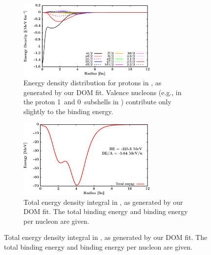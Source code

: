 \begin{figure}[tb]
    \centering
    \begin{subfigure}[c]{\textwidth}
        \centering
        \includegraphics[width=0.75\textwidth]{figures/ca40_EnergyDist.png}
        \caption[Energy density distribution for protons in \caForty]
        {
            Energy density distribution for protons in \caForty, as generated
            by our DOM fit. Valence nucleons (e.g., in the proton 1\sOne\ and
            0\dThree\ subshells in \caForty) contribute only slightly to the binding
            energy.
        }
        \label{Ca40EnergyDist}
    \end{subfigure}\vspace{16pt}
    \begin{subfigure}[c]{\textwidth}
        \centering
        \includegraphics[width=0.75\textwidth]{figures/ca40_EnergyDistIntegral.png}
        \caption[Total energy density integral in \caForty]
        {
            Total energy density integral in \caForty, as generated
            by our DOM fit. The total binding energy and binding energy per
            nucleon are given.
        }
        \label{Ca40EnergyDistIntegral}
    \end{subfigure}
\end{figure}

